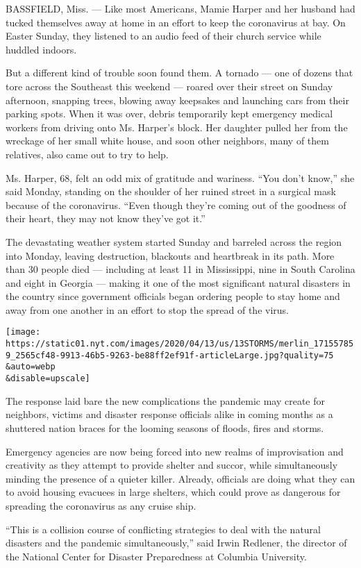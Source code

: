 BASSFIELD, Miss. --- Like most Americans, Mamie Harper and her husband
had tucked themselves away at home in an effort to keep the coronavirus
at bay. On Easter Sunday, they listened to an audio feed of their church
service while huddled indoors.

But a different kind of trouble soon found them. A tornado --- one of
dozens that tore across the Southeast this weekend --- roared over their
street on Sunday afternoon, snapping trees, blowing away keepsakes and
launching cars from their parking spots. When it was over, debris
temporarily kept emergency medical workers from driving onto Ms.
Harper's block. Her daughter pulled her from the wreckage of her small
white house, and soon other neighbors, many of them relatives, also came
out to try to help.

Ms. Harper, 68, felt an odd mix of gratitude and wariness. ``You don't
know,'' she said Monday, standing on the shoulder of her ruined street
in a surgical mask because of the coronavirus. ``Even though they're
coming out of the goodness of their heart, they may not know they've got
it.''

The devastating weather system started Sunday and barreled across the
region into Monday, leaving destruction, blackouts and heartbreak in its
path. More than 30 people died --- including at least 11 in Mississippi,
nine in South Carolina and eight in Georgia --- making it one of the
most significant natural disasters in the country since government
officials began ordering people to stay home and away from one another
in an effort to stop the spread of the virus.

\texttt{[image: https://static01.nyt.com/images/2020/04/13/us/13STORMS/merlin\_171557859\_2565cf48-9913-46b5-9263-be88ff2ef91f-articleLarge.jpg?quality=75\\\&auto=webp\\\&disable=upscale]}

The response laid bare the new complications the pandemic may create for
neighbors, victims and disaster response officials alike in coming
months as a shuttered nation braces for the looming seasons of floods,
fires and storms.

Emergency agencies are now being forced into new realms of improvisation
and creativity as they attempt to provide shelter and succor, while
simultaneously minding the presence of a quieter killer. Already,
officials are doing what they can to avoid housing evacuees in large
shelters, which could prove as dangerous for spreading the coronavirus
as any cruise ship.

``This is a collision course of conflicting strategies to deal with the
natural disasters and the pandemic simultaneously,'' said Irwin
Redlener, the director of the National Center for Disaster Preparedness
at Columbia University.

